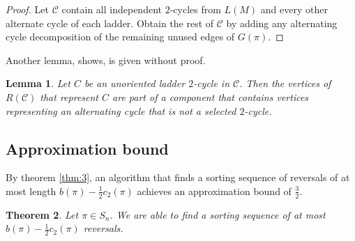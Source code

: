 \documentclass[11pt,DIV=11]{scrartcl}
\newtheorem{theorem}{Theorem}[section]
\newtheorem{lemma}[theorem]{Lemma}
\theoremstyle{definition}
\theoremstyle{remark}
\begin{document}
\begin{proof}
Let $\mathcal{C}$ contain all independent $2$-cycles from $L(M)$ and every other alternate cycle of each ladder. Obtain the rest of $\mathcal{C}$ by adding any alternating cycle decomposition of the remaining unused edges of $G(\pi)$.
\end{proof}

Another lemma, \citeauthor*{Christie1998} shows, is given without proof.

\begin{lemma}
\label{lem:10}
Let $C$ be an unoriented ladder $2$-cycle in $\mathcal{C}$. Then the vertices of $R(\mathcal{C})$ that represent $C$ are part of a component that contains vertices representing an alternating cycle that is not a selected $2$-cycle.
\end{lemma}

\subsection{Approximation bound}
\label{sec:approximation_bound}

By theorem \ref{thm:3}, an algorithm that finds a sorting sequence of reversals of at most length $b(\pi) - \frac{1}{2} c_2(\pi)$ achieves an approximation bound of $\frac{3}{2}$.

\begin{theorem}
\label{thm:6}
Let $\pi \in S_n$. We are able to find a sorting sequence of at most $b(\pi) - \frac{1}{2} c_2(\pi)$ reversals.
\end{theorem}
\end{document}
